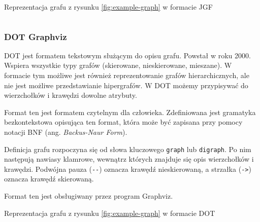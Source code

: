 \begin{listing}[H]
    \caption{Reprezentacja grafu z rysunku \ref{fig:example-graph} w formacie JGF}
    \inputminted{json}{example.json}
    \label{lst:jgf-example}
\end{listing}

\subsubsection{DOT Graphviz} 

DOT jest formatem tekstowym służącym do opisu grafu. Powstał w roku 2000. Wspiera wszystkie typy grafów (skierowane, nieskierowane, mieszane). W formacie tym możliwe jest również reprezentowanie grafów hierarchicznych, ale nie jest możliwe przedstawianie hipergrafów. W DOT możemy przypisywać do wierzchołków i krawędzi dowolne atrybuty.  

Format ten jest formatem czytelnym dla człowieka. Zdefiniowana jest gramatyka bezkontekstowa opisująca ten format, która może być zapisana przy pomocy notacji BNF (ang. \textit{Backus-Naur Form}).

Definicja grafu rozpoczyna się od słowa kluczowego \texttt{graph} lub \texttt{digraph}. Po nim następują nawiasy klamrowe, wewnątrz których znajduje się opis wierzchołków i krawędzi. Podwójna pauza (\texttt{-{}-}) oznacza krawędź nieskierowaną, a strzałka (\texttt{->}) oznacza krawędź skierowaną.

Format ten jest obsługiwany przez program Graphviz.

\bigskip

\begin{listing}[H]
    \caption{Reprezentacja grafu z rysunku \ref{fig:example-graph} w formacie DOT}
    \inputminted{text}{example.gv}
    \label{lst:dot-example}
\end{listing}

